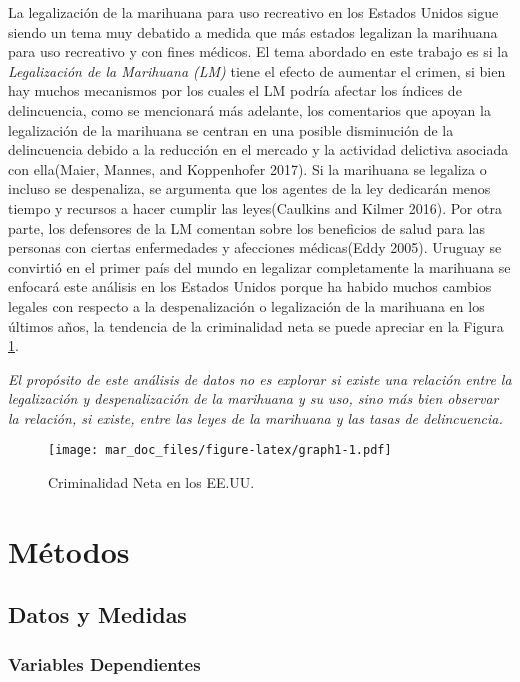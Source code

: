 \documentclass[11pt,]{article}
\begin{document}
La legalización de la marihuana para uso recreativo en los Estados
Unidos sigue siendo un tema muy debatido a medida que más estados
legalizan la marihuana para uso recreativo y con fines médicos. El tema
abordado en este trabajo es si la \emph{Legalización de la Marihuana
(LM)} tiene el efecto de aumentar el crimen, si bien hay muchos
mecanismos por los cuales el LM podría afectar los índices de
delincuencia, como se mencionará más adelante, los comentarios que
apoyan la legalización de la marihuana se centran en una posible
disminución de la delincuencia debido a la reducción en el mercado y la
actividad delictiva asociada con ella(Maier, Mannes, and Koppenhofer
2017). Si la marihuana se legaliza o incluso se despenaliza, se
argumenta que los agentes de la ley dedicarán menos tiempo y recursos a
hacer cumplir las leyes(Caulkins and Kilmer 2016). Por otra parte, los
defensores de la LM comentan sobre los beneficios de salud para las
personas con ciertas enfermedades y afecciones médicas(Eddy 2005).
Uruguay se convirtió en el primer país del mundo en legalizar
completamente la marihuana se enfocará este análisis en los Estados
Unidos porque ha habido muchos cambios legales con respecto a la
despenalización o legalización de la marihuana en los últimos años, la
tendencia de la criminalidad neta se puede apreciar en la Figura
\ref{fig:plot1}.

\emph{El propósito de este análisis de datos no es explorar si existe
una relación entre la legalización y despenalización de la marihuana y
su uso, sino más bien observar la relación, si existe, entre las leyes
de la marihuana y las tasas de delincuencia.}

\begin{figure}
\centering
\texttt{[image: mar\_doc\_files/figure-latex/graph1-1.pdf]}
\caption{\label{fig:plot1} Criminalidad Neta en los EE.UU.}
\end{figure}

\hypertarget{metodos}{%
\section{Métodos}\label{metodos}}

\hypertarget{datos-y-medidas}{%
\subsection{Datos y Medidas}\label{datos-y-medidas}}

\hypertarget{variables-dependientes}{%
\subsubsection{Variables Dependientes}\label{variables-dependientes}}
\end{document}
